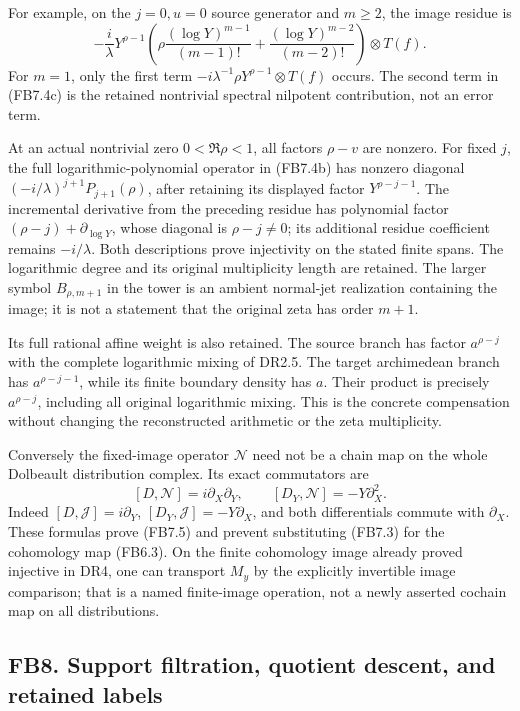For example, on the \(j=0,u=0\) source generator and \(m\ge2\), the
image residue is \[
-\frac{i}{\lambda}Y^{\rho-1}
\left(\rho\frac{(\log Y)^{m-1}}{(m-1)!}
+\frac{(\log Y)^{m-2}}{(m-2)!}\right)\otimes T(f).
\tag{FB7.4c}
\] For \(m=1\), only the first term
\(-i\lambda^{-1}\rho Y^{\rho-1}\otimes T(f)\) occurs. The second term in
(FB7.4c) is the retained nontrivial spectral nilpotent contribution, not
an error term.

At an actual nontrivial zero \(0<\Re\rho<1\), all factors \(\rho-v\) are
nonzero. For fixed \(j\), the full logarithmic-polynomial operator in
(FB7.4b) has nonzero diagonal \((-i/\lambda)^{j+1}P_{j+1}(\rho)\), after
retaining its displayed factor \(Y^{\rho-j-1}\). The incremental
derivative from the preceding residue has polynomial factor
\((\rho-j)+\partial_{\log Y}\), whose diagonal is \(\rho-j\ne0\); its
additional residue coefficient remains \(-i/\lambda\). Both descriptions
prove injectivity on the stated finite spans. The logarithmic degree and
its original multiplicity length are retained. The larger symbol
\(B_{\rho,m+1}\) in the tower is an ambient normal-jet realization
containing the image; it is not a statement that the original zeta has
order \(m+1\).

Its full rational affine weight is also retained. The source branch has
factor \(a^{\rho-j}\) with the complete logarithmic mixing of DR2.5. The
target archimedean branch has \(a^{\rho-j-1}\), while its finite
boundary density has \(a\). Their product is precisely \(a^{\rho-j}\),
including all original logarithmic mixing. This is the concrete
compensation without changing the reconstructed arithmetic or the zeta
multiplicity.

Conversely the fixed-image operator \(\mathscr N\) need not be a chain
map on the whole Dolbeault distribution complex. Its exact commutators
are \[
[D,\mathscr N]=i\partial_X\partial_Y,\qquad
[D_Y,\mathscr N]=-Y\partial_X^2.
\tag{FB7.5}
\] Indeed \([D,\mathscr J]=i\partial_Y\),
\([D_Y,\mathscr J]=-Y\partial_X\), and both differentials commute with
\(\partial_X\). These formulas prove (FB7.5) and prevent substituting
(FB7.3) for the cohomology map (FB6.3). On the finite cohomology image
already proved injective in DR4, one can transport \(M_y\) by the
explicitly invertible image comparison; that is a named finite-image
operation, not a newly asserted cochain map on all distributions.

\subsection{FB8. Support filtration, quotient descent, and retained
labels}\label{fb8.-support-filtration-quotient-descent-and-retained-labels}

